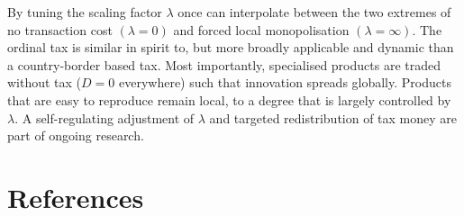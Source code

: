 \documentclass[final,5p,times,twocolumn,11pt,authoryear]{elsarticle}
\numberwithin{equation}{section} %
\begin{document}
By tuning the scaling factor $\lambda$ once can interpolate between the two extremes of no transaction cost $(\lambda=0)$ and forced local monopolisation $(\lambda=\infty)$. 
The ordinal tax is similar in spirit to, but more broadly applicable and dynamic than a country-border based tax. 
Most importantly, specialised products are traded without tax ($D=0$ everywhere) such that innovation spreads globally. 
Products that are easy to reproduce remain local, to a degree that is largely controlled by $\lambda$. 
A self-regulating adjustment of $\lambda$ and targeted redistribution of tax money are part of ongoing research. 



\section*{References}


\end{document}
